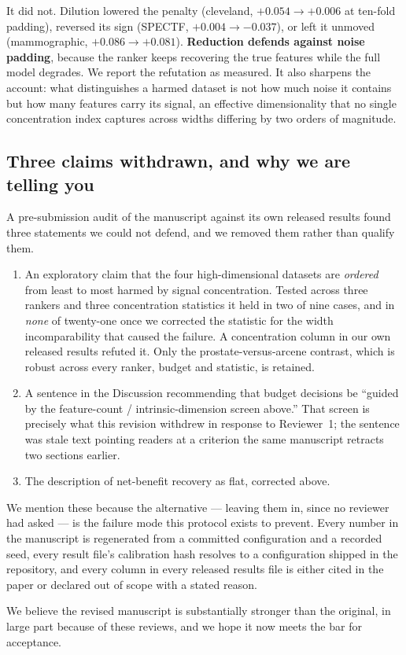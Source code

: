 \documentclass[11pt]{article}
\begin{document}
It did not. Dilution lowered the penalty (cleveland, $+0.054\to+0.006$ at ten-fold padding),
reversed its sign (SPECTF, $+0.004\to-0.037$), or left it unmoved (mammographic,
$+0.086\to+0.081$). \textbf{Reduction defends against noise padding}, because the ranker keeps
recovering the true features while the full model degrades. We report the refutation as measured. It
also sharpens the account: what distinguishes a harmed dataset is not how much noise it contains but
how many features carry its signal, an effective dimensionality that no single concentration index
captures across widths differing by two orders of magnitude.

\subsection*{Three claims withdrawn, and why we are telling you}

A pre-submission audit of the manuscript against its own released results found three statements we
could not defend, and we removed them rather than qualify them.

\begin{enumerate}[leftmargin=1.4em,itemsep=2pt]
\item An exploratory claim that the four high-dimensional datasets are \emph{ordered} from least to
      most harmed by signal concentration. Tested across three rankers and three concentration
      statistics it held in two of nine cases, and in \emph{none} of twenty-one once we corrected the
      statistic for the width incomparability that caused the failure. A concentration column in our
      own released results refuted it. Only the prostate-versus-arcene contrast, which is robust
      across every ranker, budget and statistic, is retained.
\item A sentence in the Discussion recommending that budget decisions be ``guided by the
      feature-count / intrinsic-dimension screen above.'' That screen is precisely what this revision
      withdrew in response to Reviewer~1; the sentence was stale text pointing readers at a criterion
      the same manuscript retracts two sections earlier.
\item The description of net-benefit recovery as flat, corrected above.
\end{enumerate}

We mention these because the alternative --- leaving them in, since no reviewer had asked --- is the
failure mode this protocol exists to prevent. Every number in the manuscript is regenerated from a
committed configuration and a recorded seed, every result file's calibration hash resolves to a
configuration shipped in the repository, and every column in every released results file is either
cited in the paper or declared out of scope with a stated reason.


We believe the revised manuscript is substantially stronger than the original, in large part
because of these reviews, and we hope it now meets the bar for acceptance.
\end{document}
